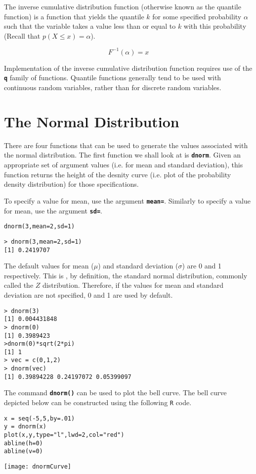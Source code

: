 The inverse cumulative distribution function (otherwise known as the quantile function) is a function that yields the quantile $k$ for some specified probability $\alpha$ such that the variable takes a value less than or equal to $k$ with this probability (Recall that $p(X \leq x) = \alpha $).

\[F^{-1}(\alpha) = x  \]

Implementation of the inverse cumulative distribution function requires use of the \texttt{\textbf{q}} family of functions. Quantile functions generally tend to be used with continuous random variables, rather than for discrete random variables.
\newpage
\section{The Normal Distribution}

There are four functions that can be used to generate the values associated with the normal distribution.  
The first function we shall look at is \textbf{\texttt{dnorm}}. Given an appropriate set of argument values (i.e. for mean and standard deviation), this function returns the height of the desnity curve (i.e. plot of the probability density distribution) for those specifications. 

To specify a value for mean, use the argument \textbf{\texttt{mean=}}. Similarly to specify a value for mean, use the argument \textbf{\texttt{sd=}}.

\begin{framed}
\begin{verbatim}
dnorm(3,mean=2,sd=1)
\end{verbatim}
\end{framed}
\begin{verbatim}
> dnorm(3,mean=2,sd=1)
[1] 0.2419707
\end{verbatim}
The default values for mean ($\mu$) and standard deviation ($\sigma$) are 0 and 1 respectively. This is , by definition, the standard normal distribution, commonly called the $Z$ distribution. Therefore, if the values for mean and standard deviation are not specified, 0 and 1 are used by default.
\begin{verbatim}
> dnorm(3)
[1] 0.004431848
> dnorm(0)
[1] 0.3989423
>dnorm(0)*sqrt(2*pi)
[1] 1
> vec = c(0,1,2)
> dnorm(vec)
[1] 0.39894228 0.24197072 0.05399097
\end{verbatim}
The command \texttt{\textbf{dnorm()}} can be used to plot the bell curve. The bell curve depicted below can be constructed using the following \texttt{R} code.
\begin{framed}
\begin{verbatim}
x = seq(-5,5,by=.01)
y = dnorm(x) 
plot(x,y,type="l",lwd=2,col="red")
abline(h=0)
abline(v=0)
\end{verbatim}
\end{framed}
 \begin{center}
 \texttt{[image: dnormCurve]}
 \end{center}
 

